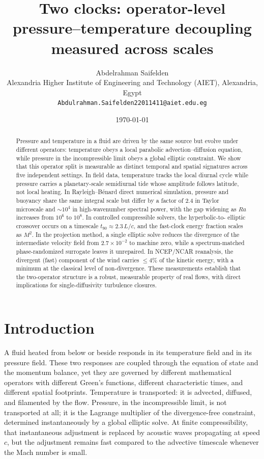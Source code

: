 \documentclass[11pt]{article}
\title{Two clocks: operator-level pressure--temperature decoupling measured across scales}
\author{Abdelrahman Saifelden\\ Alexandria Higher Institute of Engineering and Technology (AIET), Alexandria, Egypt\\ \texttt{Abdulrahman.Saifelden22011411@aiet.edu.eg}}
\date{\today}
\begin{document}
\maketitle

\begin{abstract}
Pressure and temperature in a fluid are driven by the same source but evolve under
different operators: temperature obeys a local parabolic advection--diffusion
equation, while pressure in the incompressible limit obeys a global elliptic
constraint. We show that this operator split is measurable as distinct temporal and
spatial signatures across five independent settings. In field data, temperature
tracks the local diurnal cycle while pressure carries a planetary-scale semidiurnal
tide whose amplitude follows latitude, not local heating. In Rayleigh--B\'enard
direct numerical simulation, pressure and buoyancy share the same integral scale
but differ by a factor of 2.4 in Taylor microscale and $\sim 10^{4}$ in
high-wavenumber spectral power, with the gap widening as $Ra$ increases from
$10^{6}$ to $10^{8}$. In controlled compressible solvers, the hyperbolic-to-
elliptic crossover occurs on a timescale $t_{90} \approx 2.3\,L/c$, and the
fast-clock energy fraction scales as $M^{2}$. In the projection method, a single
elliptic solve reduces the divergence of the intermediate velocity field from
$2.7\times 10^{-2}$ to machine zero, while a spectrum-matched phase-randomized
surrogate leaves it unrepaired. In NCEP/NCAR reanalysis, the divergent (fast)
component of the wind carries $\leq 4\%$ of the kinetic energy, with a minimum at
the classical level of non-divergence. These measurements establish that the
two-operator structure is a robust, measurable property of real flows, with direct
implications for single-diffusivity turbulence closures.
\end{abstract}

\section{Introduction}
\label{sec:intro}

A fluid heated from below or beside responds in its temperature field and in its
pressure field. These two responses are coupled through the equation of state and
the momentum balance, yet they are governed by different mathematical operators
with different Green's functions, different characteristic times, and different
spatial footprints. Temperature is transported: it is advected, diffused, and
filamented by the flow. Pressure, in the incompressible limit, is not transported
at all; it is the Lagrange multiplier of the divergence-free constraint,
determined instantaneously by a global elliptic solve. At finite compressibility,
that instantaneous adjustment is replaced by acoustic waves propagating at speed
$c$, but the adjustment remains fast compared to the advective timescale whenever
the Mach number is small.
\end{document}
